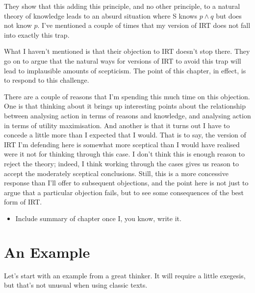 \documentclass[11pt,]{book}
\providecommand{\tightlist}{%
  \setlength{\itemsep}{0pt}\setlength{\parskip}{0pt}}
\begin{document}
They show that this adding this principle, and no other principle, to a natural theory of knowledge leads to an absurd situation where S knows \(p \wedge q\) but does not know \(p\). I've mentioned a couple of times that my version of IRT does not fall into exactly this trap.

What I haven't mentioned is that their objection to IRT doesn't stop there. They go on to argue that the natural ways for versions of IRT to avoid this trap will lead to implausible amounts of scepticism. The point of this chapter, in effect, is to respond to this challenge.

There are a couple of reasons that I'm spending this much time on this objection. One is that thinking about it brings up interesting points about the relationship between analysing action in terms of reasons and knowledge, and analysing action in terms of utility maximisation. And another is that it turns out I have to concede a little more than I expected that I would. That is to say, the version of IRT I'm defending here is somewhat more sceptical than I would have realised were it not for thinking through this case. I don't think this is enough reason to reject the theory; indeed, I think working through the cases gives us reason to accept the moderately sceptical conclusions. Still, this is a more concessive response than I'll offer to subsequent objections, and the point here is not just to argue that a particular objection fails, but to see some consequences of the best form of IRT.

\begin{itemize}
\tightlist
\item
  Include summary of chapter once I, you know, write it.
\end{itemize}

\hypertarget{frankielee}{%
\section{An Example}\label{frankielee}}

Let's start with an example from a great thinker. It will require a little exegesis, but that's not unusual when using classic texts.
\end{document}
